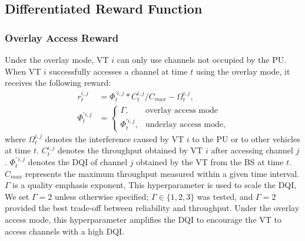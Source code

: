 \documentclass[journal]{IEEEtran}
\begin{document}
\subsection{Differentiated Reward Function}
\subsubsection{Overlay Access Reward}
Under the overlay mode, VT $i$ can only use channels not occupied by the PU. When VT $i$ successfully accesses a channel at time $t$ using the overlay mode, it receives the following reward:
\begin{equation}
\label{eq:reward_definition_final} 
\begin{split} 
r_t^{i,j} &= \Phi_t^{'i,j}*C_t^{i,j}/C_{max}- \Omega_t^{i,j},\\
\Phi_t^{'i,j} &= \begin{cases} 
\Gamma, & \text{overlay access mode} \\
\Phi_t^{'i,j},      & \text{underlay access mode}, 
\end{cases}
\end{split}
\end{equation}
where $\Omega _t^{i,j}$ denotes the interference caused by VT $i$ to the PU or to other vehicles at time $t$. $C_t^{i,j}$ denotes the throughput obtained by VT $i$ after accessing channel $j$. $\Phi_t^{\prime\, i,j}$ denotes the DQI of channel $j$ obtained by the VT from the BS at time $t$. $C_{max}$ represents the maximum throughput measured within a given time interval. $\Gamma$ is a quality emphasis exponent, This hyperparameter is used to scale the DQI, We set $\Gamma=2$ unless otherwise specified; $\Gamma\in\{1,2,3\}$ was tested, and $\Gamma=2$ provided the best trade-off between reliability and throughput. Under the overlay access mode, this hyperparameter amplifies the DQI to encourage the VT to access channels with a high DQI.
\end{document}
